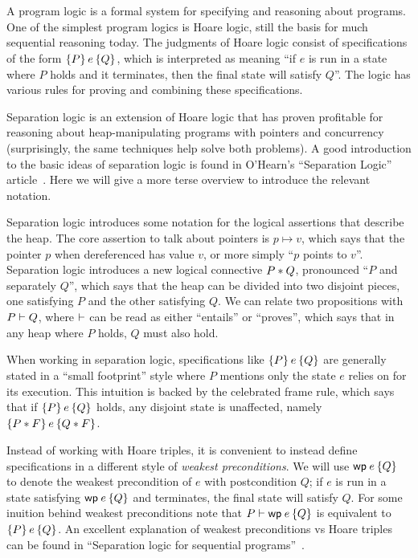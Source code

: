 A program logic is a formal system for specifying and reasoning about programs.
One of the simplest program logics is Hoare logic, still the basis for much
sequential reasoning today. The judgments of Hoare logic consist of
specifications of the form $\hoare{P}{e}{Q}$, which is interpreted as meaning
``if $e$ is run in a state where $P$ holds and it terminates, then the final
state will satisfy $Q$''. The logic has various rules for proving and combining
these specifications.

Separation logic is an extension of Hoare logic that has proven profitable for
reasoning about heap-manipulating programs with pointers and concurrency
(surprisingly, the same techniques help solve both problems). A good
introduction to the basic ideas of separation logic is found in O'Hearn's
``Separation Logic'' article~\cite{ohearn:seplogic}. Here we will give a more
terse overview to introduce the relevant notation.

Separation logic introduces some notation for the logical assertions that
describe the heap. The core assertion to talk about pointers is $p \mapsto v$,
which says that the pointer $p$ when dereferenced has value $v$, or more simply
``$p$ points to $v$''. Separation logic introduces a new logical connective
$P * Q$, pronounced ``$P$ and separately $Q$'', which says that the heap can
be divided into two disjoint pieces, one satisfying $P$ and the other satisfying
$Q$. We can relate two propositions with $P \vdash Q$, where $\vdash$ can be
read as either ``entails'' or ``proves'', which says that in any heap where $P$
holds, $Q$ must also hold.

When working in separation logic, specifications like $\hoare{P}{e}{Q}$ are
generally stated in a ``small footprint'' style where $P$ mentions only the
state $e$ relies on for its execution. This intuition is backed by the
celebrated frame rule, which says that if $\hoare{P}{e}{Q}$ holds, any disjoint
state is unaffected, namely $\hoare{P \sep F}{e}{Q \sep F}$.

Instead of working with Hoare triples, it is convenient to instead define
specifications in a different style of \emph{weakest preconditions}. We will use
$\wpre{e}{Q}$ to denote the weakest precondition of $e$ with postcondition $Q$;
if $e$ is run in a state satisfying $\wpre{e}{Q}$ and terminates, the final
state will satisfy $Q$. For some inuition behind weakest preconditions note that
$P \proves \wpre{e}{Q}$ is equivalent to $\hoare{P}{e}{Q}$. An excellent
explanation of weakest preconditions vs Hoare triples can be found in
``Separation logic for sequential programs''~\cite{chargueraud:seq-seplogic}.

